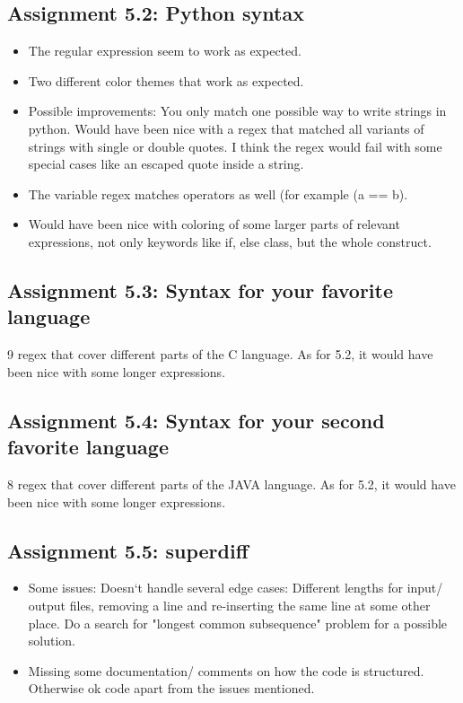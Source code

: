 \documentclass[a4paper]{article}
\begin{document}
\subsection*{Assignment 5.2: Python syntax} \label{sec:assignment5.2}
\begin{itemize}	
  \item The regular expression seem to work as expected.	
  \item Two different color themes that work as expected.
  \item Possible improvements: You only match one possible way to write strings in python. Would have been nice with a regex that matched all variants of strings with single or double quotes. I think the regex would fail with some special cases like an escaped quote inside a string.
 \item The variable regex matches operators as well (for example (a == b).
 \item Would have been nice with coloring of some larger parts of relevant expressions, not only keywords like if, else class, but the whole construct.
\end{itemize}

\subsection*{Assignment 5.3: Syntax for your favorite language}
9 regex that cover different parts of the C language. As for 5.2, it would have been nice with some longer expressions.

\subsection*{Assignment 5.4: Syntax for your second favorite language}
8 regex that cover different parts of the JAVA language. As for 5.2, it would have been nice with some longer expressions.

\subsection*{Assignment 5.5: superdiff}
\begin{itemize}
  \item Some issues: Doesn`t handle several edge cases: Different lengths for input/ output files, removing a line and re-inserting the same line at some other place. Do a search for "longest common subsequence" problem for a possible solution.
    \item Missing some documentation/ comments on how the code is structured. Otherwise ok code apart from the issues mentioned.
\end{itemize}
\end{document}
